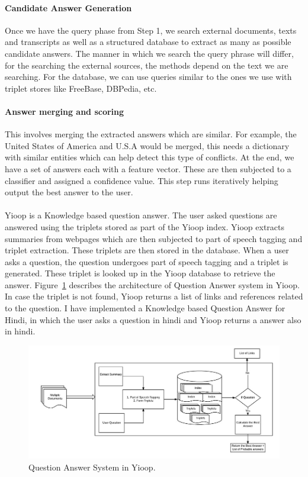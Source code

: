 \paragraph{Candidate Answer Generation}
Once we have the query phase from Step 1, we search external documents, texts and transcripts as well as a structured database to extract as many as possible candidate answers. The manner in which we search the query phrase will differ, for the searching the external sources, the methods depend on the text we are searching. For the database, we can use queries similar to the ones we use with triplet stores like FreeBase, DBPedia, etc.

\paragraph{Answer merging and scoring}
This involves merging the extracted answers which are similar. For example, the United States of America and U.S.A would be merged, this needs a dictionary with similar entities which can help detect this type of conflicts. At the end, we have a set of answers each with a feature vector. These are then subjected to a classifier and assigned a confidence value. This step runs iteratively helping output the best answer to the user.

 \break

 \paragraph{}
 Yioop is a Knowledge based question answer. The user asked questions are answered using the triplets stored as part of the Yioop index. Yioop extracts summaries from webpages which are then subjected to part of speech tagging and triplet extraction. These triplets are then stored in the database. When a user asks a question, the question undergoes part of speech tagging and a triplet is generated. These triplet is looked up in the Yioop database to retrieve the answer. Figure~\ref{fig:QA_Yioop}  describes the architecture of Question Answer system in Yioop. In case the triplet is not found, Yioop returns a list of links and references related to the question. I have implemented a Knowledge based Question Answer for Hindi, in which the user asks a question in hindi and Yioop returns a answer also in hindi.
 
 \begin{figure}[htb]
\centering
\includegraphics{images/QA_Yioop.jpg}
\caption{Question Answer System in Yioop.} 
\label{fig:QA_Yioop}
\end{figure}